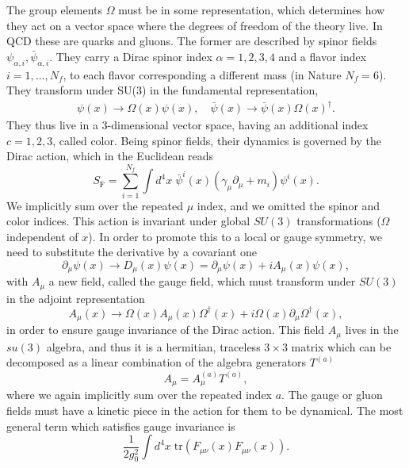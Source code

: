 The group elements $\Omega$ must be in some representation, which determines how they act on a vector space where the degrees of freedom of the theory live. In QCD these are quarks and gluons. The former are described by spinor fields $\psi_{\alpha,i},\bar{\psi}_{\alpha,i}$. They carry a Dirac spinor index $\alpha=1,2,3,4$ and a flavor index $i=1,...,N_f$, to each flavor corresponding a different mass (in Nature $N_f=6$). They transform under SU(3) in the fundamental representation,
\begin{gather}
\psi(x)\to\Omega(x)\psi(x), \quad \bar{\psi}(x)\to\bar{\psi}(x)\Omega(x)^{\dagger}.
\end{gather}
They thus live in a 3-dimensional vector space, having an additional index $c=1,2,3$, called color. Being spinor fields, their dynamics is governed by the Dirac action, which in the Euclidean reads
\begin{equation}
S_{\textrm{F}}=\sum_{i=1}^{N_f}\int d^4x\;\bar{\psi}^{i}(x)\left(\gamma_{\mu}\partial_{\mu}+m_i\right)\psi^i(x).
\end{equation} 
We implicitly sum over the repeated $\mu$ index, and we omitted the spinor and color indices. This action is invariant under global $SU(3)$ transformations ($\Omega$ independent of $x$). In order to promote this to a local or gauge symmetry, we need to substitute the derivative by a covariant one
\begin{equation}
\partial_{\mu}\psi(x)\to D_{\mu}(x)\psi(x)=\partial_{\mu}\psi(x)+iA_{\mu}(x)\psi(x),
\end{equation}
with $A_{\mu}$ a new field, called the gauge field, which must transform under $SU(3)$ in the adjoint representation
\begin{equation}
\label{ch_foundation:eq:Agauge}
A_{\mu}(x)\to\Omega(x)A_{\mu}(x)\Omega^{\dagger}(x)+i\Omega(x)\partial_{\mu}\Omega^{\dagger}(x),
\end{equation}
in order to ensure gauge invariance of the Dirac action. This field $A_{\mu}$ lives in the $su(3)$ algebra, and thus it is a hermitian, traceless $3\times 3$ matrix which can be decomposed as a linear combination of the algebra generators $T^{(a)}$
\begin{equation}
A_{\mu}=A_{\mu}^{(a)}T^{(a)},
\end{equation}
where we again implicitly sum over the repeated index $a$. The gauge or gluon fields must have a kinetic piece in the action for them to be dynamical. The most general term which satisfies gauge invariance is
\begin{equation}
\label{ch_foundation:eq:SYM}
\frac{1}{2g_0^2}\int d^4x\;\textrm{tr}(F_{\mu\nu}(x)F_{\mu\nu}(x)).
\end{equation}

